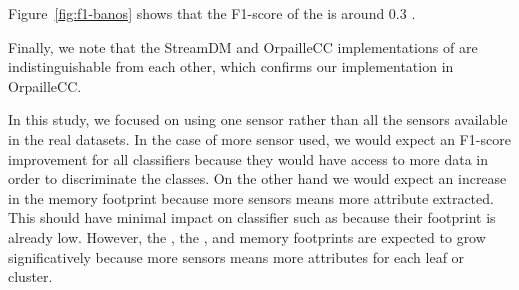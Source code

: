 Figure~\ref{fig:f1-banos} shows that the F1-score of the \FNN
is around 0.3 . 

Finally, we note that the StreamDM and OrpailleCC implementations of
\naivebayes are indistinguishable from each other, which confirms our
implementation in OrpailleCC.

In this study, we focused on using one sensor rather than all the sensors
available in the real datasets. In the case of more sensor used, we would
expect an F1-score improvement for all classifiers because they would have
access to more data in order to discriminate the classes. On the other hand we
would expect an increase in the memory footprint because more sensors means
more attribute extracted. This should have minimal impact on classifier such as
\naivebayes because their footprint is already low. However, the
\mondrianforest, the \hoeffdingtree, and \mcnn memory footprints are expected to grow
significatively because more sensors means more attributes for each leaf or cluster.

